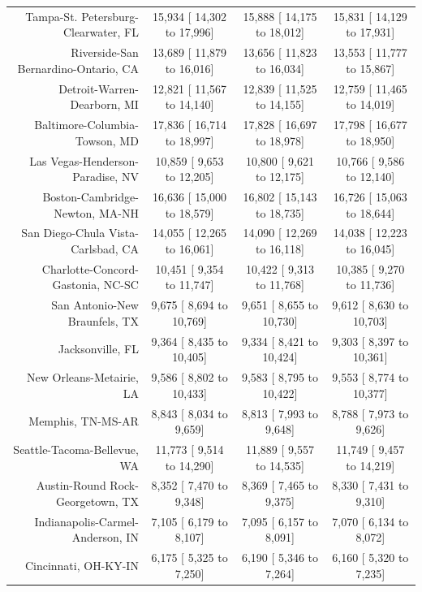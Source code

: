 \documentclass{article}
\begin{document}
\begin{table}[H]
\begin{tabular}{|r|c|c|c|}
		Tampa-St. Petersburg-Clearwater, FL &  15,934 [ 14,302 to  17,996] &  15,888 [ 14,175 to  18,012] &  15,831 [ 14,129 to  17,931]\\
		Riverside-San Bernardino-Ontario, CA &  13,689 [ 11,879 to  16,016] &  13,656 [ 11,823 to  16,034] &  13,553 [ 11,777 to  15,867]\\
		Detroit-Warren-Dearborn, MI &  12,821 [ 11,567 to  14,140] &  12,839 [ 11,525 to  14,155] &  12,759 [ 11,465 to  14,019]\\
		Baltimore-Columbia-Towson, MD &  17,836 [ 16,714 to  18,997] &  17,828 [ 16,697 to  18,978] &  17,798 [ 16,677 to  18,950]\\
		Las Vegas-Henderson-Paradise, NV &  10,859 [  9,653 to  12,205] &  10,800 [  9,621 to  12,175] &  10,766 [  9,586 to  12,140]\\
		Boston-Cambridge-Newton, MA-NH &  16,636 [ 15,000 to  18,579] &  16,802 [ 15,143 to  18,735] &  16,726 [ 15,063 to  18,644]\\
		San Diego-Chula Vista-Carlsbad, CA &  14,055 [ 12,265 to  16,061] &  14,090 [ 12,269 to  16,118] &  14,038 [ 12,223 to  16,045]\\
		Charlotte-Concord-Gastonia, NC-SC &  10,451 [  9,354 to  11,747] &  10,422 [  9,313 to  11,768] &  10,385 [  9,270 to  11,736]\\
		San Antonio-New Braunfels, TX &   9,675 [  8,694 to  10,769] &   9,651 [  8,655 to  10,730] &   9,612 [  8,630 to  10,703]\\
		Jacksonville, FL &   9,364 [  8,435 to  10,405] &   9,334 [  8,421 to  10,424] &   9,303 [  8,397 to  10,361]\\
		New Orleans-Metairie, LA &   9,586 [  8,802 to  10,433] &   9,583 [  8,795 to  10,422] &   9,553 [  8,774 to  10,377]\\
		Memphis, TN-MS-AR &   8,843 [  8,034 to   9,659] &   8,813 [  7,993 to   9,648] &   8,788 [  7,973 to   9,626]\\
		Seattle-Tacoma-Bellevue, WA &  11,773 [  9,514 to  14,290] &  11,889 [  9,557 to  14,535] &  11,749 [  9,457 to  14,219]\\
		Austin-Round Rock-Georgetown, TX &   8,352 [  7,470 to   9,348] &   8,369 [  7,465 to   9,375] &   8,330 [  7,431 to   9,310]\\
		Indianapolis-Carmel-Anderson, IN &   7,105 [  6,179 to   8,107] &   7,095 [  6,157 to   8,091] &   7,070 [  6,134 to   8,072]\\
		Cincinnati, OH-KY-IN &   6,175 [  5,325 to   7,250] &   6,190 [  5,346 to   7,264] &   6,160 [  5,320 to   7,235]\\

\end{tabular}
\end{table}
\end{document}
